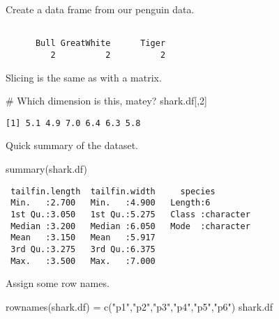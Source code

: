 \documentclass[
  letterpaper,
  DIV=11,
  numbers=noendperiod]{scrartcl}
\newenvironment{Shaded}{\begin{snugshade}}{\end{snugshade}}
\newcommand{\CommentTok}[1]{\textcolor[rgb]{0.37,0.37,0.37}{#1}}
\newcommand{\DecValTok}[1]{\textcolor[rgb]{0.68,0.00,0.00}{#1}}
\newcommand{\FunctionTok}[1]{\textcolor[rgb]{0.28,0.35,0.67}{#1}}
\newcommand{\NormalTok}[1]{\textcolor[rgb]{0.00,0.23,0.31}{#1}}
\newcommand{\OtherTok}[1]{\textcolor[rgb]{0.00,0.23,0.31}{#1}}
\newcommand{\SpecialCharTok}[1]{\textcolor[rgb]{0.37,0.37,0.37}{#1}}
\newcommand{\StringTok}[1]{\textcolor[rgb]{0.13,0.47,0.30}{#1}}
\begin{document}
Create a data frame from our penguin data.

\begin{Shaded}
\end{Shaded}

\begin{verbatim}

      Bull GreatWhite      Tiger 
         2          2          2 
\end{verbatim}

Slicing is the same as with a matrix.

\begin{Shaded}
\begin{Highlighting}[]
\CommentTok{\# Which dimension is this, matey?}
\NormalTok{shark.df[,}\DecValTok{2}\NormalTok{]}
\end{Highlighting}
\end{Shaded}

\begin{verbatim}
[1] 5.1 4.9 7.0 6.4 6.3 5.8
\end{verbatim}

Quick summary of the dataset.

\begin{Shaded}
\begin{Highlighting}[]
\FunctionTok{summary}\NormalTok{(shark.df)}
\end{Highlighting}
\end{Shaded}

\begin{verbatim}
 tailfin.length  tailfin.width     species         
 Min.   :2.700   Min.   :4.900   Length:6          
 1st Qu.:3.050   1st Qu.:5.275   Class :character  
 Median :3.200   Median :6.050   Mode  :character  
 Mean   :3.150   Mean   :5.917                     
 3rd Qu.:3.275   3rd Qu.:6.375                     
 Max.   :3.500   Max.   :7.000                     
\end{verbatim}

Assign some row names.

\begin{Shaded}
\begin{Highlighting}[]
\FunctionTok{rownames}\NormalTok{(shark.df) }\OtherTok{=} \FunctionTok{c}\NormalTok{(}\StringTok{"p1"}\NormalTok{,}\StringTok{"p2"}\NormalTok{,}\StringTok{"p3"}\NormalTok{,}\StringTok{"p4"}\NormalTok{,}\StringTok{"p5"}\NormalTok{,}\StringTok{"p6"}\NormalTok{)}
\NormalTok{shark.df}
\end{Highlighting}
\end{Shaded}
\end{document}
